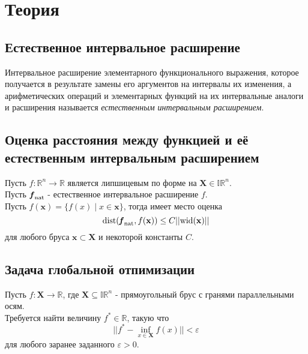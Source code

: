 \section{Теория}
\subsection{Естественное интервальное расширение}
Интервальное расширение элементарного функционального выражения, которое получается в результате замены его аргументов на интервалы их изменения, а арифметических операций и элементарных функций на их интервальные аналоги и расширения называется \textit{естественным интервальным расширением}.
\subsection{Оценка расстояния между функцией и её естественным интервальным расширением}
Пусть $f:\mathbb{R}^n\rightarrow\mathbb{R}$ является липшицевым по форме на $\mathbf{X}\in\mathbb{IR}^n$.\\
Пусть $\textbf{\textit{f}}_{\mathrm{nat}}$ - естественное интервальное расширение $f$.\\
Пусть $f(\mathbf{x})=\{f(x)\;|\;x\in\mathbf{x}\}$, тогда имеет место оценка
\begin{equation} \label{Estimate}
    \mathrm{dist}(\textbf{\textit{f}}_{\mathrm{nat}},f(\mathbf{x}))\leq C||\mathrm{wid}(\mathbf{x})||
\end{equation}
для любого бруса $\mathbf{x}\subset\mathbf{X}$ и некоторой константы $C$.
\subsection{Задача глобальной отпимизации}
Пусть $f:\mathbf{X}\rightarrow\mathbb{R}$, где $\mathbf{X}\subseteq\mathbb{IR}^n$ - прямоугольный брус с гранями параллельными осям.\\
Требуется найти величину $f^*\in\mathbb{R}$, такую что
\begin{equation}
    ||f^*-\inf_{x\in\mathbf{X}}f(x)||<\varepsilon
\end{equation}
для любого заранее заданного $\varepsilon>0$.
